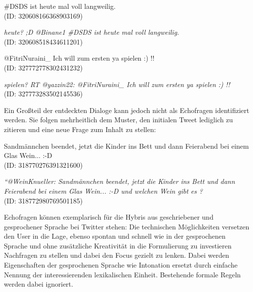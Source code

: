 \documentclass[main.tex]{subfiles}
\begin{document}
\begin{example}
\#DSDS ist heute mal voll langweilig.\\(ID: 320608166368903169)

\textit{heute? ;D  @Binane1 \#DSDS ist heute mal voll langweilig.}\\ (ID: 320608518434611201)
\end{example}

\begin{example}
@FitriNuraini\_  Ich will zum ersten ya spielen :) !!\\ (ID: 327772778302431232)

\textit{spielen? RT @yazzin22: @FitriNuraini\_  Ich will zum ersten ya spielen :) !!}\\ (ID: 327773283502145536)
\end{example}

Ein Großteil der entdeckten Dialoge kann jedoch nicht als Echofragen identifiziert werden. Sie folgen mehrheitlich dem Muster, den initialen Tweet lediglich zu zitieren und eine neue Frage zum Inhalt zu stellen:

\begin{example}
Sandmännchen beendet, jetzt die Kinder ins Bett und dann Feierabend bei einem Glas Wein... :-D\\ (ID: 318770276391321600)

\textit{“@WeinKnueller: Sandmännchen beendet, jetzt die Kinder ins Bett und dann Feierabend bei einem Glas Wein... :-D und welchen Wein gibt es ?} \\ (ID: 318772980769501185)
\end{example}

Echofragen können exemplarisch für die Hybris aus geschriebener und gesprochener Sprache bei Twitter stehen: Die technischen Möglichkeiten versetzen den User in die Lage, ebenso spontan und schnell wie in der gesprochenen Sprache und ohne zusätzliche Kreativität in die Formulierung zu investieren Nachfragen zu stellen und dabei den Focus gezielt zu lenken. Dabei werden Eigenschaften der gesprochenen Sprache wie Intonation ersetzt durch einfache Nennung der interessierenden lexikalischen Einheit. Bestehende formale Regeln werden dabei ignoriert.
\end{document}
